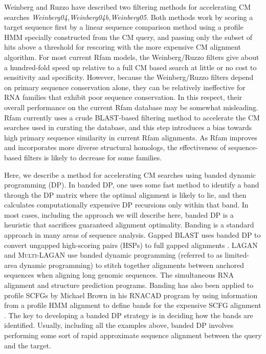 \documentclass[11pt]{article}
\begin{document}
Weinberg and Ruzzo have described two filtering methods for
accelerating CM searches
\emph{Weinberg04,Weinberg04b,Weinberg05}. Both methods work by scoring
a target sequence first by a linear sequence comparison method using a
profile HMM specially constructed from the CM query, and passing only
the subset of hits above a threshold for rescoring with the more
expensive CM alignment algorithm.  For most current Rfam models, the
Weinberg/Ruzzo filters give about a hundred-fold speed up relative to
a full CM based search at little or no cost to sensitivity and
specificity. However, because the Weinberg/Ruzzo filters depend on
primary sequence conservation alone, they can be relatively
ineffective for RNA families that exhibit poor sequence
conservation. In this respect, their overall performance on the
current Rfam database may be somewhat misleading. Rfam currently uses
a crude BLAST-based filtering method to accelerate the CM searches
used in curating the database, and this step introduces a bias towards
high primary sequence similarity in current Rfam alignments. As Rfam
improves and incorporates more diverse structural homologs, the
effectiveness of sequence-based filters is likely to decrease for some
families.

Here, we describe a method for accelerating CM searches using banded
dynamic programming (DP). In banded DP, one uses some fast method to
identify a band through the DP matrix where the optimal alignment is
likely to lie, and then calculates computationally expensive DP
recursions only within that band. In most cases, including the
approach we will describe here, banded DP is a heuristic that
sacrifices guaranteed alignment optimality. Banding is a standard
approach in many areas of sequence analysis. Gapped \textsc{BLAST}
uses banded DP to convert ungapped high-scoring pairs (HSPs) to full
gapped alignments \cite{Altschul90,XXX}.  \textsc{LAGAN} and
\textsc{Multi-LAGAN} use banded dynamic programming (referred to as
limited-area dynamic programming) to stitch together alignments
between anchored sequences when aligning long genomic sequences. The
simultaneous RNA alignment and structure prediction programs. Banding
has also been applied to profile SCFGs by Michael Brown in his
\textsc{RNACAD} program by using information from a profile HMM
alignment to define bands for the expensive SCFG alignment
\cite{Brown00}. The key to developing a banded DP strategy is in
deciding how the bands are identified.  Usually, including all the
examples above, banded DP involves performing some sort of rapid
approximate sequence alignment between the query and the target.
\end{document}
